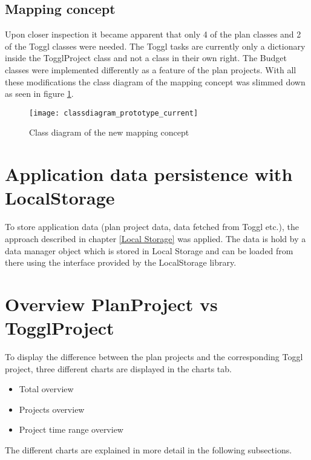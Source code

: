 \subsection{Mapping concept}
Upon closer inspection it became apparent that only 4 of the plan classes and 2 of the Toggl classes were needed. The Toggl tasks are currently only a dictionary inside the TogglProject class and not a class in their own right. The Budget classes were implemented differently as a feature of the plan projects. With all these modifications the class diagram of the mapping concept was slimmed down as seen in figure \ref{classdiagram_prototype_current}.
\begin{figure}[H]
	\centering
	\texttt{[image: classdiagram\_prototype\_current]}
	\caption{Class diagram of the new mapping concept}
	\label{classdiagram_prototype_current}
\end{figure}

\section{Application data persistence with LocalStorage}
To store application data (plan project data, data fetched from Toggl etc.), the approach described in chapter \ref{Local Storage} was applied. The data is hold by a data manager object which is stored in Local Storage and can be loaded from there using the interface provided by the LocalStorage library.

\section{Overview PlanProject vs TogglProject} \label{Graphical overview}
To display the difference between the plan projects and the corresponding Toggl project, three different charts are displayed in the charts tab.
\begin{itemize}
	\item Total overview
	\item Projects overview
	\item Project time range overview
\end{itemize}
The different charts are explained in more detail in the following subsections.

